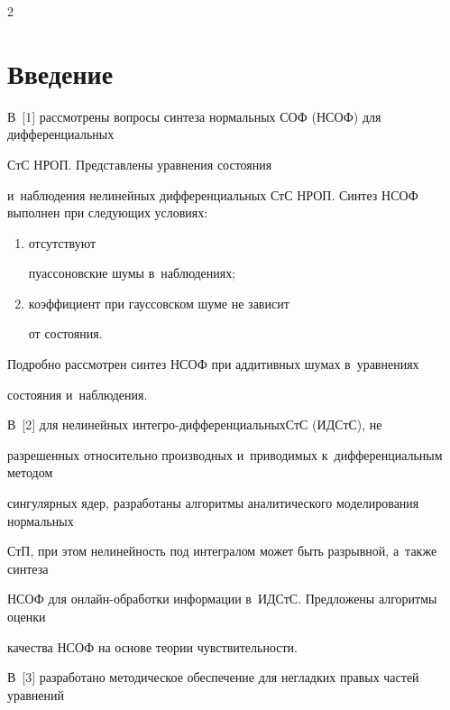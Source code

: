 \thispagestyle{headings}



\begin{multicols}{2}



\label{st\stat}



\section{Введение}





В~[1] рассмотрены вопросы синтеза нормальных СОФ (НСОФ) для дифференциальных 

СтС НРОП. Представлены уравнения состояния 

и~наблюдения нелинейных дифференциальных СтС НРОП. Синтез НСОФ выполнен при следующих условиях: 

\begin{enumerate}[(1)]

\item отсутствуют 

пуассоновские шумы в~наблюдениях; 

\item коэффициент при гауссовском шуме не зависит 

от состояния.

\end{enumerate}

 Подробно рассмотрен синтез НСОФ при аддитивных шумах в~уравнениях 

состояния и~наблюдения.

%

В~[2] для нелинейных интег\-ро-диф\-фе\-рен\-ци\-аль\-ных\linebreak СтС (ИДСтС), не 

разрешенных относительно производных и~приводимых к~дифференциальным методом 

сингулярных ядер, разработаны алгоритмы аналитического моделирования нормальных 

СтП, при этом нелинейность под интегралом может быть разрывной, а~также синтеза 

НСОФ для он\-лайн-об\-ра\-бот\-ки информации в~ИДСтС. Предложены алгоритмы оценки 

качества НСОФ на основе теории чувствительности.

%

В~[3] разработано методическое обеспечение для негладких правых частей уравнений 


\end{multicols}
